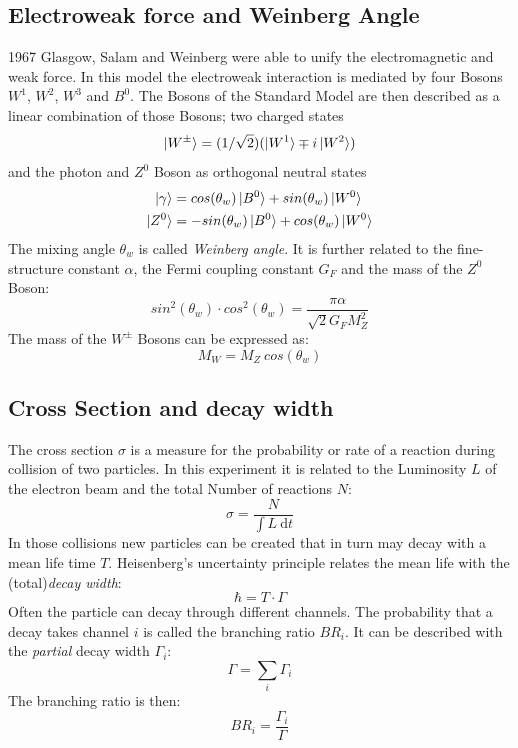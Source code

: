 \subsection{Electroweak force and Weinberg Angle}
1967 Glasgow, Salam and Weinberg were able to unify the electromagnetic and weak force. In this model the electroweak interaction is mediated by four Bosons $W^1$, $W^2$, $W^3$ and $B^0$. The Bosons of the Standard Model are then described as a linear combination of those Bosons; two charged states
\begin{equation}
\ket{W^{\pm}}=(1/\sqrt{2}) (\ket{W^1}\mp i\ket{W^2})
\end{equation}
and the photon and $Z^0$ Boson as orthogonal neutral states\cite{Grif}
\begin{equation}
\begin{aligned}
\ket{\gamma} &=  cos(\theta_w)\ket{B^0} + sin(\theta_w) \ket{W^0}\\
\ket{Z^0} &= -sin(\theta_w) \ket{B^0} + cos(\theta_w) \ket{W^0}
\end{aligned}
\end{equation}
The mixing angle $\theta_w$ is called \emph{Weinberg angle}. It is further related to the fine-structure constant  $\alpha$, the Fermi coupling constant $G_F$ and the mass of the $Z^0$ Boson\cite{muenchen}:
\begin{equation}
sin^2(\theta_w)\cdot cos^2(\theta_w) = \frac{\pi\alpha}{\sqrt{2}G_FM_Z^2}
\end{equation}
The mass of the $W^{\pm}$ Bosons can be expressed as:
\begin{equation}
M_W = M_Z~cos(\theta_w)
\end{equation}

\subsection{Cross Section and decay width}
The cross section $\sigma$ is a measure for the probability or rate of a reaction during collision of two particles. In this experiment it is related to the Luminosity $L$ of the electron beam and the total Number of reactions $N$:
\begin{equation}
\sigma = \frac{N}{\int L~\text{d}t}
\end{equation}
In those collisions new particles can be created that in turn may decay with a mean life time $T$.
Heisenberg's uncertainty principle relates the mean life with the (total)\emph{decay width}:
\begin{equation}
\hbar=T\cdot\Gamma
\end{equation}
Often the particle can decay through different channels. The probability that a decay takes channel $i$ is called the branching ratio $BR_i$. It can be described with the \emph{partial} decay width $\Gamma_i$:
\begin{equation}
\Gamma = \sum_i \Gamma_i
\end{equation}
The branching ratio is then:
\begin{equation}
BR_i=\frac{\Gamma_i}{\Gamma}
\label{eq:principles:branching ratio}
\end{equation}

